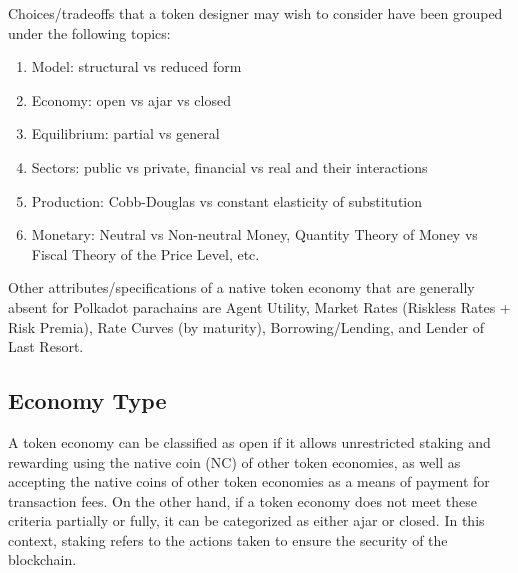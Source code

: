 \documentclass[11pt]{article}
\begin{document}
Choices/tradeoffs that a token designer may wish to consider have been grouped under the following topics:

\begin{enumerate}
    \item[] Model: structural vs reduced form
    \item[] Economy: open vs ajar vs closed
    \item[] Equilibrium: partial vs general
    \item[] Sectors: public vs private, financial vs real and their interactions
    \item[] Production: Cobb-Douglas vs constant elasticity of substitution
    \item[] Monetary: Neutral vs Non-neutral Money, Quantity Theory of Money vs Fiscal Theory of the Price Level, etc.
\end{enumerate}

Other attributes/specifications of a native token economy that are generally absent for Polkadot parachains are Agent Utility, Market Rates (Riskless Rates + Risk Premia), Rate Curves (by maturity), Borrowing/Lending, and Lender of Last Resort.

\subsection{Economy Type}
A token economy can be classified as open if it allows unrestricted staking and rewarding using the native coin (NC) of other token economies, as well as accepting the native coins of other token economies as a means of payment for transaction fees. On the other hand, if a token economy does not meet these criteria partially or fully, it can be categorized as either ajar or closed. In this context, staking refers to the actions taken to ensure the security of the blockchain. 
\end{document}
